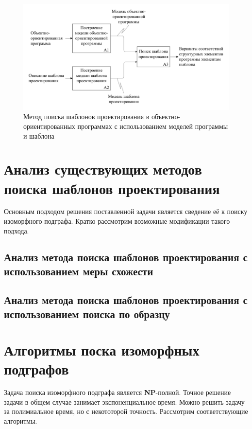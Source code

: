 \begin{figure}
\centering
\includegraphics[width=\textwidth]{inc/idef0-general.pdf}
\caption{Метод поиска шаблонов проектирования в объектно-ориентированных программах с использованием моделей программы и шаблона}
\label{fig:idef0-general}
\end{figure}

\section{Анализ существующих методов поиска шаблонов проектирования}

Основным подходом решения поставленной задачи является сведение её к поиску
изоморфного подграфа.
Кратко рассмотрим возможные модификации такого подхода.

\subsection{Анализ метода поиска шаблонов проектирования с использованием меры схожести}

\cite{DesignPatternSimilarityScoring}

\subsection{Анализ метода поиска шаблонов проектирования с использованием поиска по образцу}

\cite{DesignPatternTemplateMatching}

\section{Алгоритмы поска изоморфных подграфов}

Задача поиска изоморфного подграфа является \textbf{NP}-полной.
Точное решение задачи в общем случае занимает экспоненциальное время.
Можно решить задачу за полимиальное время, но с некототорой точность.
Рассмотрим соответствующие алгоритмы.

